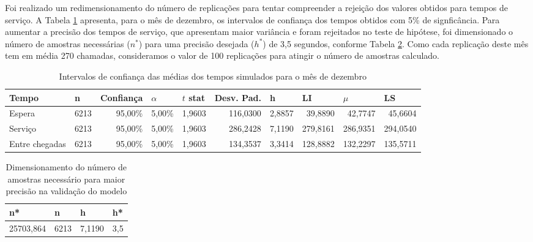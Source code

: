     
Foi realizado um redimensionamento do número de replicações para tentar compreender a rejeição dos valores obtidos para tempos de serviço. A Tabela \ref*{fig: intervalo-confianca} apresenta, para o mês de dezembro, os intervalos de confiança dos tempos obtidos com 5\% de signficância. Para aumentar a precisão dos tempos de serviço, que apresentam maior variância e foram rejeitados no teste de hipótese, foi dimensionado o número de amostras necessárias ($n^*$) para uma precisão desejada ($h^*$) de 3,5 segundos, conforme Tabela \ref*{fig: dimensionamento-corridas}. Como cada replicação deste mês tem em média 270 chamadas, consideramos o valor de 100 replicações para atingir o número de amostras calculado.

\begin{table}[H]
    \begin{tabular}{|l|r|r|r|r|r|r|r|r|r|}
    \hline
    Tempo & \multicolumn{1}{l|}{n} & \multicolumn{1}{l|}{Confiança} & \multicolumn{1}{l|}{$\alpha$} & \multicolumn{1}{l|}{$t$ stat} & \multicolumn{1}{l|}{Desv. Pad.} & \multicolumn{1}{l|}{h} & \multicolumn{1}{l|}{LI} & \multicolumn{1}{l|}{$\mu$} & \multicolumn{1}{l|}{LS} \\ \hline
    Espera & 6213 & 95,00\% & 5,00\% & 1,9603 & 116,0300 & 2,8857 & 39,8890 & 42,7747 & 45,6604 \\ \hline
    Serviço & 6213 & 95,00\% & 5,00\% & 1,9603 & 286,2428 & 7,1190 & 279,8161 & 286,9351 & 294,0540 \\ \hline
    Entre chegadas & 6213 & 95,00\% & 5,00\% & 1,9603 & 134,3537 & 3,3414 & 128,8882 & 132,2297 & 135,5711 \\ \hline
    \end{tabular}
    \caption{Intervalos de confiança das médias dos tempos simulados para o mês de dezembro}
    \label{fig: intervalo-confianca}
\end{table}

\begin{table}[H]
    \centering
    \begin{tabular}{|l|l|l|l|}
    \hline
    n* & n & h & h* \\ \hline
    \multicolumn{1}{|r|}{25703,864} & \multicolumn{1}{r|}{6213} & \multicolumn{1}{r|}{7,1190} & \multicolumn{1}{r|}{3,5} \\ \hline
    \end{tabular}
    \caption{Dimensionamento do número de amostras necessário para maior precisão na validação do modelo}
    \label{fig: dimensionamento-corridas}
\end{table}
    
